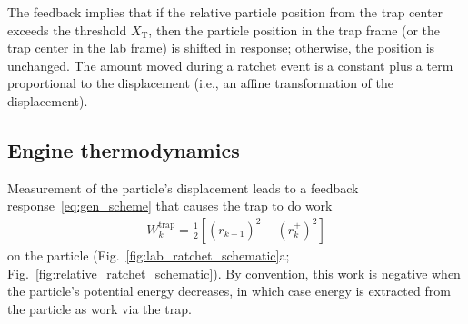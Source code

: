 \documentclass[%
reprint,
bibnotes, amsmath, amssymb, aps, pre,
 showkeys,
floatfix
]{revtex4-2}
\newcommand{\mrm}{\mathrm}
\newcommand{\pr}[1]{\left(#1\right)} %
\newcommand{\sr}[1]{\left[#1\right]} %
\newcommand{\xkrp}{r_{k+1}}
\newcommand{\xkpr}{r_{k}^{+}}
\newcommand{\wt}{W^{\mrm{trap}}}
\newcommand{\xT}{X_{\mrm{T}}}
\begin{document}
The feedback implies that if the relative particle position from the trap center exceeds the threshold $\xT$, then the particle position in the trap frame (or the trap center in the lab frame) is shifted in response; otherwise, the position is unchanged.
The amount moved during a ratchet event is a constant plus a term proportional to the displacement (i.e., an affine transformation of the displacement).


\subsection{Engine thermodynamics}
\label{subsec:engine_thermo}

Measurement of the particle's displacement leads to a feedback response~\eqref{eq:gen_scheme} that causes the trap to do work
\begin{align}
    \wt_{k} = \frac{1}{2}\sr{\pr{\xkrp}^{2}-\pr{\xkpr}^{2}} \label{eq:trap_work_def}
\end{align}
on the particle (Fig.~\ref{fig:lab_ratchet_schematic}a; Fig.~\ref{fig:relative_ratchet_schematic}).
By convention, this work is negative when the particle's potential energy decreases, in which case energy is extracted from the particle as work via the trap.
\end{document}

